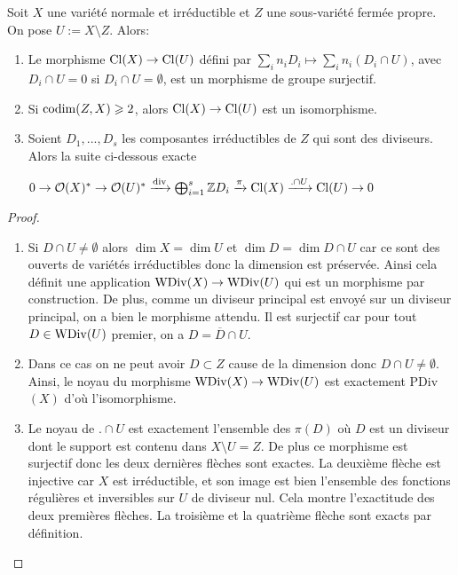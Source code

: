 \begin{thm}\label{divexactseq}
Soit $X$ une variété normale et irréductible et $Z$ une sous-variété fermée propre. On pose $U:=X\setminus Z$. Alors:
\begin{enumerate}
\item Le morphisme $\operatorname{Cl}(X)\rightarrow\operatorname{Cl}(U)$ défini par $\sum_i n_iD_i\mapsto \sum_i n_i(D_i\cap U)$, avec $D_i\cap U = 0$ si $D_i\cap U=\emptyset $, est un morphisme de groupe surjectif.
\item Si $\operatorname{codim}(Z,X)\geqslant 2$, alors $\operatorname{Cl}(X)\rightarrow \operatorname{Cl}(U)$ est un isomorphisme.
\item Soient $D_1,..., D_s$ les composantes irréductibles de $Z$ qui sont des diviseurs. Alors la suite ci-dessous exacte
\begin{center}
 $0\rightarrow\mathcal{O}(X)^*\rightarrow \mathcal{O}(U)^*\xrightarrow{\operatorname{div}} \bigoplus_{i=1}^s \mathbb{Z} D_i \xrightarrow{\pi} \operatorname{Cl}(X) \xrightarrow{.\cap U} \operatorname{Cl}(U) \rightarrow 0 $
\end{center}

\end{enumerate}
\end{thm}
\begin{proof}
\begin{enumerate}
\item Si $D\cap U\neq \emptyset$ alors $\dim X=\dim U$ et $\dim D=\dim D\cap U$ car ce sont des ouverts de variétés irréductibles donc la dimension est préservée. Ainsi cela définit une application $\operatorname{WDiv}(X)\rightarrow \operatorname{WDiv}(U)$ qui est un morphisme par construction. De plus, comme un diviseur principal est envoyé sur un diviseur principal, on a bien le morphisme attendu. Il est surjectif car pour tout $D\in\operatorname{WDiv}(U)$ premier, on a $D=\overline{D}\cap U$.
\item Dans ce cas on ne peut avoir $D\subset Z$ cause de la dimension donc $D\cap U\neq \emptyset$. Ainsi, le noyau du morphisme $\operatorname{WDiv}(X)\rightarrow \operatorname{WDiv}(U)$ est exactement PDiv$(X)$ d'où l'isomorphisme.
\item Le noyau de $.\cap U$ est exactement l'ensemble des $\pi(D)$ où $D$ est un diviseur dont le support est contenu dans $X\setminus U=Z$. De plus ce morphisme est surjectif donc les deux dernières flèches sont exactes. La deuxième flèche est injective car $X$ est irréductible, et son image est bien l'ensemble des fonctions régulières et inversibles sur $U$ de diviseur nul. Cela montre l'exactitude des deux premières flèches. La troisième et la quatrième flèche sont exacts par définition.
\end{enumerate}
\end{proof}

